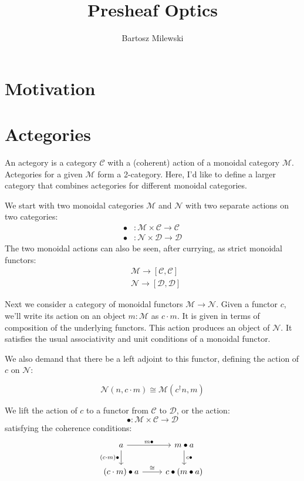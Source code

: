 \documentclass[11pt]{amsart}
\author{Bartosz Milewski}
\title{Presheaf Optics}
\newcommand{\cat}[1]{\mathcal{#1}}%
\begin{document}
\maketitle{}

\section{Motivation}


\section{Actegories}

An actegory is a category $\cat C$ with a (coherent) action of a monoidal category $\cat M$. Actegories for a given $\cat M$ form a 2-category. Here, I'd like to define a larger category that combines actegories for different monoidal categories.

We start with two monoidal categories $\cat M$ and $\cat N$ with two separate actions on two categories:
\begin{align*} 
\bullet &\colon \cat M \times \cat C \to \cat C 
\\
 \bullet &\colon \cat N \times \cat D \to \cat D 
\end{align*}
The two monoidal actions can also be seen, after currying, as strict monoidal functors:
\begin{align*}
&\cat M \to [\cat C, \cat C]
\\
&\cat N \to [\cat D, \cat D]
\end{align*}

Next we consider a category of monoidal functors $\cat M \to \cat N$. Given a functor $c$, we'll write its action on an object $m \colon \cat M$ as $c \cdot m$. It is given in terms of composition of the underlying functors. This action produces an object of $\cat N$. It satisfies the usual associativity and unit conditions of a monoidal functor. 

We also demand that there be a left adjoint to this functor, defining the action of $c$ on $\cat N$:

\[ \cat N (n, c \cdot m) \cong \cat M (c^{\dagger} n, m) \]

We lift the action of $c$ to a functor from $\cat C$ to  $\cat D$, or the action:
\[ \bullet \colon \cat M \times \cat C \to \cat D \]
satisfying the coherence conditions:
\[
 \begin{tikzcd}
 a
 \arrow [r, "m \bullet"] 
 \arrow [d, "(c \cdot m) \bullet"']
 & m \bullet a
 \arrow [d, "c \bullet"]
 \\
 (c \cdot m) \bullet a
 \arrow [r, "\cong"]
 & c \bullet (m \bullet a)
 \end{tikzcd}
\]
\end{document}
